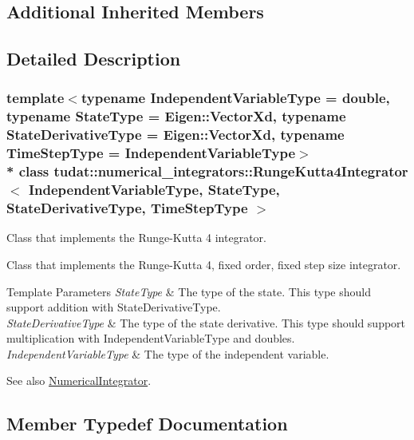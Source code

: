 \subsection*{Additional Inherited Members}


\subsection{Detailed Description}
\subsubsection*{template$<$typename Independent\+Variable\+Type = double, typename State\+Type = Eigen\+::\+Vector\+Xd, typename State\+Derivative\+Type = Eigen\+::\+Vector\+Xd, typename Time\+Step\+Type = Independent\+Variable\+Type$>$\\*
class tudat\+::numerical\+\_\+integrators\+::\+Runge\+Kutta4\+Integrator$<$ Independent\+Variable\+Type, State\+Type, State\+Derivative\+Type, Time\+Step\+Type $>$}

Class that implements the Runge-\/\+Kutta 4 integrator. 

Class that implements the Runge-\/\+Kutta 4, fixed order, fixed step size integrator. 
\begin{DoxyTemplParams}{Template Parameters}
{\em State\+Type} & The type of the state. This type should support addition with State\+Derivative\+Type. \\
\hline
{\em State\+Derivative\+Type} & The type of the state derivative. This type should support multiplication with Independent\+Variable\+Type and doubles. \\
\hline
{\em Independent\+Variable\+Type} & The type of the independent variable. \\
\hline
\end{DoxyTemplParams}
\begin{DoxySeeAlso}{See also}
\hyperlink{classtudat_1_1numerical__integrators_1_1NumericalIntegrator}{Numerical\+Integrator}. 
\end{DoxySeeAlso}


\subsection{Member Typedef Documentation}
